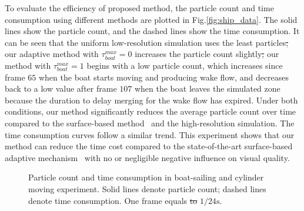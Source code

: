 \documentclass[VANCOUVER,STIX1COL]{WileyNJD-v2}
\providecommand{\DIFadd}[1]{{\protect\color{blue}\uwave{#1}}} %
\providecommand{\DIFdel}[1]{{\protect\color{red}\sout{#1}}}                      %
\providecommand{\DIFaddbegin}{} %
\providecommand{\DIFaddend}{} %
\providecommand{\DIFdelbegin}{} %
\providecommand{\DIFdelend}{} %
\providecommand{\DIFdelFL}[1]{\DIFdel{#1}} %
\providecommand{\DIFdelbeginFL}{} %
\providecommand{\DIFdelendFL}{} %
\begin{document}
\DIFdelend To evaluate the efficiency of \DIFaddbegin \DIFadd{the }\DIFaddend proposed method, the particle count and time consumption using different methods are plotted in Fig.\ref{fig:ship_data}. The solid lines show the particle count, and the dashed lines show the time consumption. It can be seen that the uniform low-resolution simulation uses the least particles\DIFdelbegin \DIFdel{; }\DIFdelend \DIFaddbegin \DIFadd{. While }\DIFaddend our adaptive method with $\tau_{boat}^{max} = 0$ increases the particle count slightly\DIFdelbegin \DIFdel{; }\DIFdelend \DIFaddbegin \DIFadd{. Further, }\DIFaddend our method with $\tau_{boat}^{max} = 1$ begins with a low particle count, which increases since frame $65$ when the boat starts moving and producing wake flow, and decreases back to a low value after frame $107$ when the boat leaves the simulated zone because the duration to delay merging for the wake flow has expired. Under both conditions, our method significantly reduces the average particle count over time compared to the surface-based method~\cite{Winchenbach17} and the high-resolution simulation. The time consumption curves follow a similar trend. This experiment shows that our method can reduce the time cost compared to the state-of-the-art surface-based adaptive mechanism~\cite{Winchenbach17} with no or negligible negative influence on visual quality.

\begin{figure}
    \centering
    \vspace{-0.7\baselineskip}
    \caption{Particle count and time consumption in boat-sailing and cylinder moving experiment. Solid lines denote particle count; dashed lines denote time consumption. One frame equals \DIFdelbeginFL \DIFdelFL{to }\DIFdelendFL $1/24\mathrm{s}$.}

\end{figure}
\end{document}
